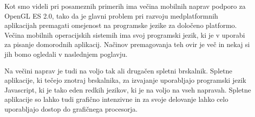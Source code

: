 Kot smo videli pri posameznih primerih ima večina mobilnih naprav podporo za OpenGL ES 2.0, tako da je glavni problem pri razvoju medplatformnih aplikacijah premagati omejenost na programske jezike za določeno platformo. Večina mobilnih operacijskih sistemih ima svoj programski jezik, ki je v uporabi za pisanje domorodnih aplikacij. Načinov premagovanja teh ovir je več in nekaj si jih bomo ogledali v naslednjem poglavju. 

Na večini naprav je tudi na voljo tak ali drugačen spletni brskalnik. Spletne aplikacije, ki tečejo znotraj brskalnika, za izvajanje uporabljajo programski jezik Javascript, ki je tako eden redkih jezikov, ki je na voljo na vseh napravah. Spletne aplikacije so lahko tudi grafično intenzivne in za svoje delovanje lahko celo uporabljajo dostop do grafičnega procesorja.
